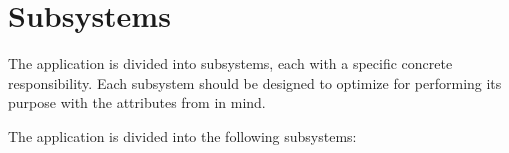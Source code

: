 \section{Subsystems}
\label{sec:subsystems}
The application is divided into subsystems, each with a specific concrete responsibility.
Each subsystem should be designed to optimize for performing its purpose with the attributes from  in mind.

The application is divided into the following subsystems:









